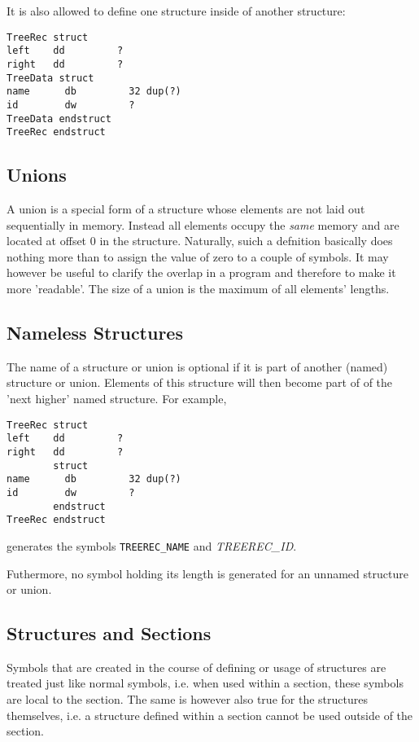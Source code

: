 \documentclass[12pt,twoside]{report}
\begin{document}
It is also allowed to define one structure inside of another
structure:
\begin{verbatim}
TreeRec struct
left    dd         ?
right   dd         ?
TreeData struct
name      db         32 dup(?)
id        dw         ?
TreeData endstruct
TreeRec endstruct
\end{verbatim}

\subsection{Unions}

A union is a special form of a structure whose elements are not laid out
sequentially in memory.  Instead all elements occupy the {\em same}
memory and are located at offset 0 in the structure.  Naturally, suich a
defnition basically does nothing more than to assign the value of zero to
a couple of symbols.  It may however be useful to clarify the overlap in a
program and therefore to make it more 'readable'.  The size of a union is
the maximum of all elements' lengths.

\subsection{Nameless Structures}

The name of a structure or union is optional if it is part of
another (named) structure or union.  Elements of this structure
will then become part of of the 'next higher' named structure.
For example,
\begin{verbatim}
TreeRec struct
left    dd         ?
right   dd         ?
        struct
name      db         32 dup(?)
id        dw         ?
        endstruct
TreeRec endstruct
\end{verbatim}
generates the symbols {\tt TREEREC\_NAME} and {\em TREEREC\_ID}.

Futhermore, no symbol holding its length is generated for an
unnamed structure or union.

\subsection{Structures and Sections}

Symbols that are created in the course of defining or usage of structures
are treated just like normal symbols, i.e. when used within a section,
these symbols are local to the section.  The same is however also true for
the structures themselves, i.e. a structure defined within a section
cannot be used outside of the section.
\end{document}
